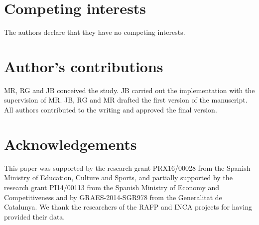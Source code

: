\documentclass{bmcart}
\begin{document}
\begin{backmatter}
\section*{Competing interests}
The authors declare that they have no competing interests.

\section*{Author's contributions}
MR, RG and JB conceived the study. JB carried out the implementation with the supervision of MR. JB, RG 
and MR drafted the first version of the manuscript. All authors contributed to the writing and
approved the final version.

\section*{Acknowledgements}
This paper was supported by the research grant PRX16/00028 from the Spanish Ministry of Education,
Culture and Sports, and partially supported by the research grant PI14/00113 from the Spanish
Ministry of Economy and Competitiveness and by GRAES-2014-SGR978 from the Generalitat de Catalunya.
We thank the researchers of the RAFP and INCA projects for having provided their data.




\end{backmatter}
\end{document}
